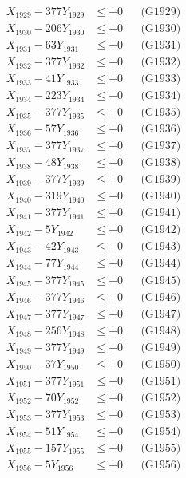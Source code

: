 \documentclass[a4paper,10pt]{article}
\begin{document}
{\begin{align}
X_{1929} - 377Y_{1929} &\leq +0 && \text{(G1929)} \\
X_{1930} - 206Y_{1930} &\leq +0 && \text{(G1930)} \\
\allowbreak
X_{1931} - 63Y_{1931} &\leq +0 && \text{(G1931)} \\
X_{1932} - 377Y_{1932} &\leq +0 && \text{(G1932)} \\
X_{1933} - 41Y_{1933} &\leq +0 && \text{(G1933)} \\
X_{1934} - 223Y_{1934} &\leq +0 && \text{(G1934)} \\
X_{1935} - 377Y_{1935} &\leq +0 && \text{(G1935)} \\
X_{1936} - 57Y_{1936} &\leq +0 && \text{(G1936)} \\
X_{1937} - 377Y_{1937} &\leq +0 && \text{(G1937)} \\
X_{1938} - 48Y_{1938} &\leq +0 && \text{(G1938)} \\
X_{1939} - 377Y_{1939} &\leq +0 && \text{(G1939)} \\
X_{1940} - 319Y_{1940} &\leq +0 && \text{(G1940)} \\
\allowbreak
X_{1941} - 377Y_{1941} &\leq +0 && \text{(G1941)} \\
X_{1942} - 5Y_{1942} &\leq +0 && \text{(G1942)} \\
X_{1943} - 42Y_{1943} &\leq +0 && \text{(G1943)} \\
X_{1944} - 77Y_{1944} &\leq +0 && \text{(G1944)} \\
X_{1945} - 377Y_{1945} &\leq +0 && \text{(G1945)} \\
X_{1946} - 377Y_{1946} &\leq +0 && \text{(G1946)} \\
X_{1947} - 377Y_{1947} &\leq +0 && \text{(G1947)} \\
X_{1948} - 256Y_{1948} &\leq +0 && \text{(G1948)} \\
X_{1949} - 377Y_{1949} &\leq +0 && \text{(G1949)} \\
X_{1950} - 37Y_{1950} &\leq +0 && \text{(G1950)} \\
\allowbreak
X_{1951} - 377Y_{1951} &\leq +0 && \text{(G1951)} \\
X_{1952} - 70Y_{1952} &\leq +0 && \text{(G1952)} \\
X_{1953} - 377Y_{1953} &\leq +0 && \text{(G1953)} \\
X_{1954} - 51Y_{1954} &\leq +0 && \text{(G1954)} \\
X_{1955} - 157Y_{1955} &\leq +0 && \text{(G1955)} \\
X_{1956} - 5Y_{1956} &\leq +0 && \text{(G1956)} \\

\end{align}}
\end{document}

